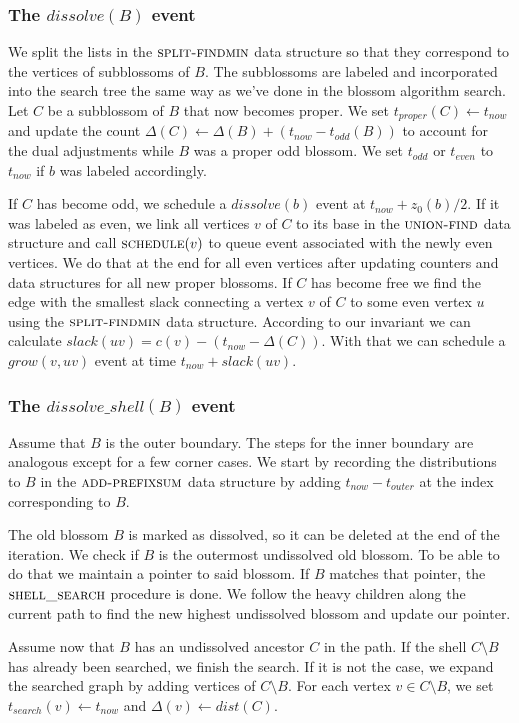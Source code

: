 \subsubsection*{The $dissolve(B)$ event} 
We split the lists in the $\textsc{split-findmin}$ data structure so that they correspond to the vertices of subblossoms of $B$. The subblossoms are labeled and incorporated into the search tree the same way as we've done in the blossom algorithm search. Let $C$ be a subblossom of $B$ that now becomes proper. We set $t_{proper}(C) \gets t_{now}$ and update the count $\Delta(C) \gets \Delta(B) + (t_{now} - t_{odd}(B))$ to account for the dual adjustments while $B$ was a proper odd blossom. We set $t_{odd}$ or $t_{even}$ to $t_{now}$ if $b$ was labeled accordingly. 

If $C$ has become odd, we schedule a $dissolve(b)$ event at $t_{now} + z_0(b) / 2$. If it was labeled as even, we link all vertices $v$ of $C$ to its base in the $\textsc{union-find}$ data structure and call $\textsc{schedule}(v)$ to queue event associated with the newly even vertices. We do that at the end for all even vertices after updating counters and data structures for all new proper blossoms. If $C$ has become free we find the edge with the smallest slack connecting a vertex $v$ of $C$ to some even vertex $u$ using the $\textsc{split-findmin}$ data structure. According to our invariant we can calculate $slack(uv) = c(v) - (t_{now} - \Delta(C))$. With that we can schedule a $grow(v, uv)$ event at time $t_{now} + slack(uv)$. 

\subsubsection*{The $dissolve\_shell(B)$ event}
Assume that $B$ is the outer boundary. The steps for the inner boundary are analogous except for a few corner cases. We start by recording the distributions to $B$ in the $\textsc{add-prefixsum}$ data structure by adding $t_{now} - t_{outer}$ at the index corresponding to $B$.

The old blossom $B$ is marked as dissolved, so it can be deleted at the end of the iteration. We check if $B$ is the outermost undissolved old blossom. To be able to do that we maintain a pointer to said blossom. If $B$ matches that pointer, the $\textsc{shell\_search}$ procedure is done. We follow the heavy children along the current path to find the new highest undissolved blossom and update our pointer.

Assume now that $B$ has an undissolved ancestor $C$ in the path. If the shell $C \setminus B$ has already been searched, we finish the search. If it is not the case, we expand the searched graph by adding vertices of $C \setminus B$. For each vertex $v \in C \setminus B$, we set $t_{search}(v) \gets t_{now}$ and $\Delta(v) \gets dist(C)$.

